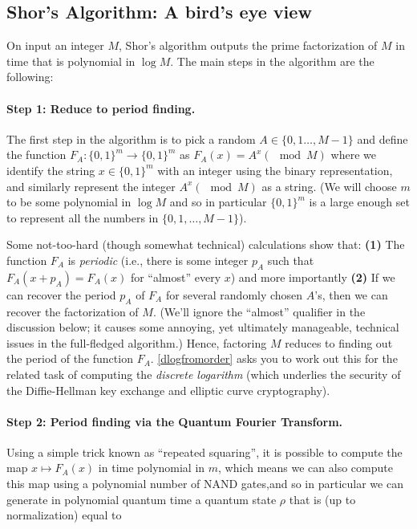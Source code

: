 \subsection{Shor's Algorithm: A bird's eye
view}\label{Shors-Algorithm-A-birds-e}

On input an integer \(M\), Shor's algorithm outputs the prime
factorization of \(M\) in time that is polynomial in \(\log M\). The
main steps in the algorithm are the following:

\paragraph{Step 1: Reduce to period finding.} The first step in the
algorithm is to pick a random \(A\in \{0,1\ldots,M-1\}\) and define the
function \(F_A:\{0,1\}^m \rightarrow \{0,1\}^m\) as
\(F_A(x)= A^x (\mod M)\) where we identify the string
\(x \in \{0,1\}^m\) with an integer using the binary representation, and
similarly represent the integer \(A^x (\mod M)\) as a string. (We will
choose \(m\) to be some polynomial in \(\log M\) and so in particular
\(\{0,1\}^m\) is a large enough set to represent all the numbers in
\(\{0,1,\ldots, M-1 \}\)).

Some not-too-hard (though somewhat technical) calculations show that:
\textbf{(1)} The function \(F_A\) is \emph{periodic} (i.e., there is
some integer \(p_A\) such that \(F_A(x+p_A)=F_A(x)\) for ``almost''
every \(x\)) and more importantly \textbf{(2)} If we can recover the
period \(p_A\) of \(F_A\) for several randomly chosen \(A\)'s, then we
can recover the factorization of \(M\). (We'll ignore the ``almost''
qualifier in the discussion below; it causes some annoying, yet
ultimately manageable, technical issues in the full-fledged algorithm.)
Hence, factoring \(M\) reduces to finding out the period of the function
\(F_A\). \cref{dlogfromorder} asks you to work out this for the related
task of computing the \emph{discrete logarithm} (which underlies the
security of the Diffie-Hellman key exchange and elliptic curve
cryptography).

\paragraph{Step 2: Period finding via the Quantum Fourier Transform.}
Using a simple trick known as ``repeated squaring'', it is possible to
compute the map \(x \mapsto F_A(x)\) in time polynomial in \(m\), which
means we can also compute this map using a polynomial number of NAND
gates,and so in particular we can generate in polynomial quantum time a
quantum state \(\rho\) that is (up to normalization) equal to

